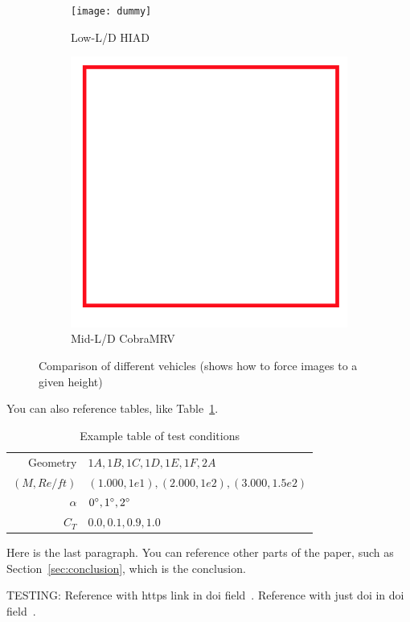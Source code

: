 \begin{figure}[htb] %
\begin{center}
    \newcommand\picW{0.49\textwidth}
    \newcommand\picH{0.75\textwidth}
    \begin{subfigure}{\picW}
      \centering
        \texttt{[image: dummy]}
        \caption{ Low-L/D HIAD }
        \label{fig:hiadconcept}
    \end{subfigure}
    \begin{subfigure}{\picW}
      \centering
      \includegraphics[trim=0 0 0 0, clip, height=\picH]{Images/dummy.png}
        \caption{ Mid-L/D CobraMRV }
        \label{fig:cobraconcept}
    \end{subfigure}
    \caption{ Comparison of different vehicles (shows how to force images to a given height)~\cite{halstrom2021aerodynamic} }
    \label{fig:vehicleconcepts}
\end{center}
\end{figure}

You can also reference tables, like Table~\ref{tab:tableexample}.

\begin{table}[H] %
\begin{center}
\caption{Example table of test conditions}
\label{tab:tableexample}
\begin{tabular}{r | l}
Geometry      & \(1A, 1B, 1C, 1D, \boxed{1E, 1F}, 2A\) \\
\((M,Re/ft)\) & \((1.000,1e1), (2.000,1e2), (3.000,1.5e2)\) \\
\(\alpha\)    & \(\SI{0}{\degree}, \SI{1}{\degree}, \SI{2}{\degree}\) \\
\(C_T\)       & \(0.0, 0.1, 0.9, 1.0\) \\
\end{tabular}
\end{center}
\end{table}




Here is the last paragraph.
You can reference other parts of the paper, such as Section~\ref{sec:conclusion}, which is the conclusion.




TESTING: Reference with https link in doi field~\cite{ref1}.
Reference with just doi in doi field~\cite{ref2}.

